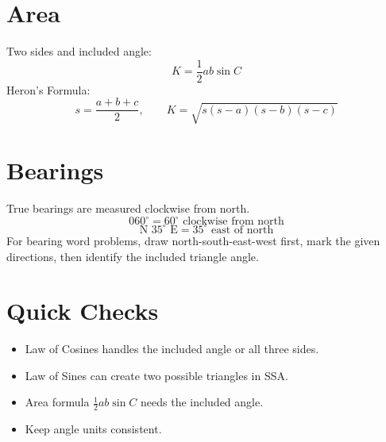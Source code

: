 \documentclass[11pt]{article}
\begin{document}
\section*{Area}
Two sides and included angle:
\[
K=\frac12 ab\sin C
\]
Heron's Formula:
\[
s=\frac{a+b+c}{2},\qquad
K=\sqrt{s(s-a)(s-b)(s-c)}
\]

\section*{Bearings}
True bearings are measured clockwise from north.
\[
060^\circ=60^\circ\text{ clockwise from north}
\]
\[
\text{N }35^\circ\text{ E}=35^\circ\text{ east of north}
\]
For bearing word problems, draw north-south-east-west first, mark the given directions, then identify the included triangle angle.

\section*{Quick Checks}
\begin{itemize}
  \item Law of Cosines handles the included angle or all three sides.
  \item Law of Sines can create two possible triangles in SSA.
  \item Area formula $\frac12 ab\sin C$ needs the included angle.
  \item Keep angle units consistent.
\end{itemize}
\end{document}
